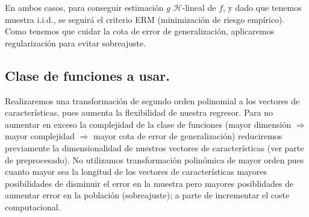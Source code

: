\documentclass[11pt,a4paper]{article}
\theoremstyle{definition}
\begin{document}
	En ambos casos, para conseguir estimación $g$ $\mathcal{H}$-lineal de $f$, y dado que tenemos muestra i.i.d., se seguirá el criterio ERM (minimización de riesgo empírico). Como tenemos que cuidar la cota de error de generalización, aplicaremos regularización para evitar sobreajuste.

	\subsection{Clase de funciones a usar.}
	Realizaremos una transformación de segundo orden polinomial a los vectores de características, pues aumenta la flexibilidad de nuestra regresor. Para no aumentar en exceso la complejidad de la clase de funciones (mayor dimensión $\Rightarrow$ mayor complejidad $\Rightarrow$ mayor cota de error de generalización) reduciremos previamente la dimensionalidad de nuestros vectores de características (ver parte de preprocesado). No utilizamos transformación polinómica de mayor orden pues cuanto mayor sea la longitud de los vectores de características mayores posibilidades de disminuir el error en la muestra pero mayores posiblidades de aumentar error en la población (sobreajuste); a parte de incrementar el coste computacional.
	
\end{document}
